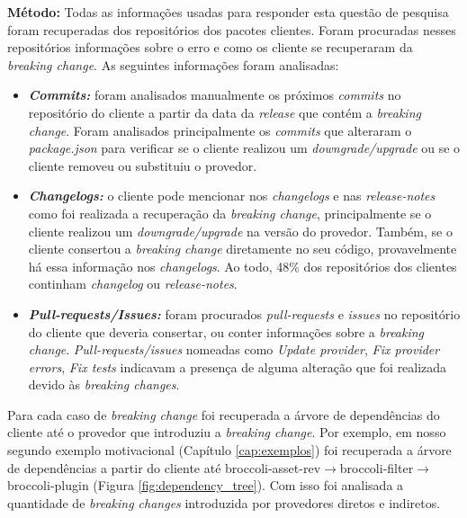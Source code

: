 \noindent
\textbf{Método:}
Todas as informações usadas para responder esta questão de pesquisa foram recuperadas dos repositórios dos pacotes clientes. Foram procuradas nesses repositórios informações sobre o erro e como os cliente se recuperaram da \textit{breaking change}. As seguintes informações foram analisadas:

\begin{itemize}
    \item \textbf{\textit{Commits:}} foram analisados manualmente os próximos \textit{commits} no repositório do cliente a partir da data da \textit{release} que contém a \textit{breaking change}. Foram analisados principalmente os \textit{commits} que alteraram o \textit{package.json} para verificar se o cliente realizou um \textit{downgrade/upgrade} ou se o cliente removeu ou substituiu o provedor.

    \item \textbf{\textit{Changelogs:}} o cliente pode mencionar nos \textit{changelogs} e nas \textit{release-notes} como foi realizada a recuperação da \textit{breaking change}, principalmente se o cliente realizou um \textit{downgrade/upgrade} na versão do provedor. Também, se o cliente consertou a \textit{breaking change} diretamente no seu código, provavelmente há essa informação nos \textit{changelogs}. Ao todo, 48\% dos repositórios dos clientes continham \textit{changelog} ou \textit{release-notes}.
    
    \item \textbf{\textit{Pull-requests/Issues:}} foram procurados \textit{pull-requests} e \textit{issues} no repositório do cliente que deveria consertar, ou conter informações sobre a \textit{breaking change}. \textit{Pull-requests/issues} nomeadas como \textit{Update provider}, \textit{Fix provider errors}, \textit{Fix tests} indicavam a presença de alguma alteração que foi realizada devido às \textit{breaking changes}.
\end{itemize}

Para cada caso de \textit{breaking change} foi recuperada a árvore de dependências do cliente até o provedor que introduziu a \textit{breaking change}. Por exemplo, em nosso segundo exemplo motivacional (Capítulo \ref{cap:exemplos}) foi recuperada a árvore de dependências a partir do cliente até \textsf{broccoli-asset-rev$\rightarrow$broccoli-filter$\rightarrow$broccoli-plugin} (Figura \ref{fig:dependency_tree}). Com isso foi analisada a quantidade de \textit{breaking changes} introduzida por provedores diretos e indiretos. 

